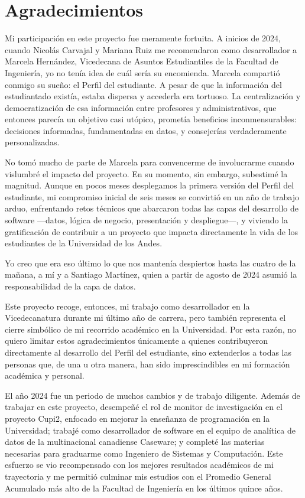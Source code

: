 \chapter*{Agradecimientos}

Mi participación en este proyecto fue meramente fortuita. A inicios de 2024, cuando Nicolás Carvajal y Mariana Ruiz me recomendaron como desarrollador a Marcela Hernández, Vicedecana de Asuntos Estudiantiles de la Facultad de Ingeniería, yo no tenía idea de cuál sería su encomienda. Marcela compartió conmigo su sueño: el Perfil del estudiante. A pesar de que la información del estudiantado existía, estaba dispersa y accederla era tortuoso. La centralización y democratización de esa información entre profesores y administrativos, que entonces parecía un objetivo casi utópico, prometía beneficios inconmensurables: decisiones informadas, fundamentadas en datos, y consejerías verdaderamente personalizadas.

No tomó mucho de parte de Marcela para convencerme de involucrarme cuando vislumbré el impacto del proyecto. En su momento, sin embargo, subestimé la magnitud. Aunque en pocos meses desplegamos la primera versión del Perfil del estudiante, mi compromiso inicial de seis meses se convirtió en un año de trabajo arduo, enfrentando retos técnicos que abarcaron todas las capas del desarrollo de software —datos, lógica de negocio, presentación y despliegue—, y viviendo la gratificación de contribuir a un proyecto que impacta directamente la vida de los estudiantes de la Universidad de los Andes.

Yo creo que era eso último lo que nos mantenía despiertos hasta las cuatro de la mañana, a mí y a Santiago Martínez, quien a partir de agosto de 2024 asumió la responsabilidad de la capa de datos.

Este proyecto recoge, entonces, mi trabajo como desarrollador en la Vicedecanatura durante mi último año de carrera, pero también representa el cierre simbólico de mi recorrido académico en la Universidad. Por esta razón, no quiero limitar estos agradecimientos únicamente a quienes contribuyeron directamente al desarrollo del Perfil del estudiante, sino extenderlos a todas las personas que, de una u otra manera, han sido imprescindibles en mi formación académica y personal.

El año 2024 fue un periodo de muchos cambios y de trabajo diligente. Además de trabajar en este proyecto, desempeñé el rol de monitor de investigación en el proyecto Cupi2, enfocado en mejorar la enseñanza de programación en la Universidad; trabajé como desarrollador de software en el equipo de analítica de datos de la multinacional canadiense Caseware; y completé las materias necesarias para graduarme como Ingeniero de Sistemas y Computación. Este esfuerzo se vio recompensado con los mejores resultados académicos de mi trayectoria y me permitió culminar mis estudios con el Promedio General Acumulado más alto de la Facultad de Ingeniería en los últimos quince años.


